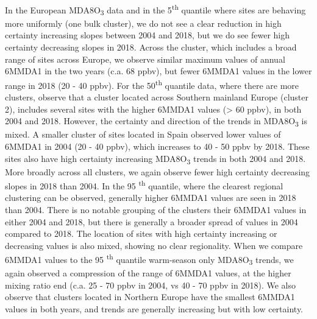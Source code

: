 \documentclass[journal abbreviation, manuscript]{copernicus}
\begin{document}
In the European MDA8O\textsubscript{3} data and in the 5\textsuperscript{th} quantile where sites are behaving more uniformly (one bulk cluster), we do not see a clear reduction in high certainty increasing slopes between 2004 and 2018, but we do see fewer high certainty decreasing slopes in 2018. Across the cluster, which includes a broad range of sites across Europe, we observe similar maximum values of annual 6MMDA1 in the two years (c.a. 68 ppbv), but fewer 6MMDA1 values in the lower range in 2018 (20 - 40 ppbv). For the 50\textsuperscript{th} quantile data, where there are more clusters, observe that a cluster located across Southern mainland Europe (cluster 2), includes several sites with the higher 6MMDA1 values (> 60 ppbv), in both 2004 and 2018. However, the certainty and direction of the trends in MDA8O\textsubscript{3} is mixed. A smaller cluster of sites located in Spain observed lower values of 6MMDA1 in 2004 (20 - 40 ppbv), which increases to 40 - 50 ppbv by 2018. These sites also have high certainty increasing MDA8O\textsubscript{3} trends in both 2004 and 2018. More broadly across all clusters, we again observe fewer high certainty decreasing slopes in 2018 than 2004. In the 95 \textsuperscript{th} quantile, where the clearest regional clustering can be observed, generally higher 6MMDA1 values are seen in 2018 than 2004. There is no notable grouping of the clusters their 6MMDA1 values in either 2004 and 2018, but there is generally a broader spread of values in 2004 compared to 2018. The location of sites with high certainty increasing or decreasing values is also mixed, showing no clear regionality. When we compare 6MMDA1 values to the 95 \textsuperscript{th} quantile warm-season only MDA8O\textsubscript{3} trends, we again observed a compression of the range of 6MMDA1 values, at the higher mixing ratio end (c.a. 25 - 70 ppbv in 2004, vs 40 - 70 ppbv in 2018). We also observe that clusters located in Northern Europe have the smallest 6MMDA1 values in both years, and trends are generally increasing but with low certainty.
\end{document}
